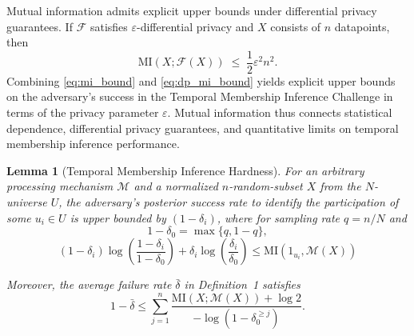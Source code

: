 \documentclass[letterpaper]{article} %
\newtheorem{lemma}[theorem]{Lemma}
\begin{document}
Mutual information admits explicit upper bounds under differential privacy guarantees. If $\mathcal{F}$ satisfies $\varepsilon$-differential privacy and $X$ consists of $n$ datapoints, then
\begin{equation}\label{eq:dp_mi_bound}
\mathrm{MI}\!\left(X;\mathcal{F}(X)\right)
\;\le\;
\frac{1}{2}\varepsilon^2 n^2.
\end{equation}
Combining \eqref{eq:mi_bound} and \eqref{eq:dp_mi_bound} yields explicit upper bounds on the adversary's success in the Temporal Membership Inference Challenge in terms of the privacy parameter $\varepsilon$. Mutual information thus connects statistical dependence, differential privacy guarantees, and quantitative limits on temporal membership inference performance.

\begin{lemma}[Temporal Membership Inference Hardness]\label{lem:membership-hardness}
For an arbitrary processing mechanism $\mathcal{M}$ and a normalized $n$-random-subset $X$ from the $N$-universe $U$, the adversary's posterior success rate to identify the participation of some $u_i \in U$ is upper bounded by $(1-\delta_i)$, where for sampling rate $q = n/N$ and
\[
1 - \delta_0 = \max\{q, 1-q\},
\]
\begin{equation}\label{eq:individual_mi_bound}
(1-\delta_i)\log\!\left(\frac{1-\delta_i}{1-\delta_0}\right)
+ \delta_i \log\!\left(\frac{\delta_i}{\delta_0}\right)
\le \mathrm{MI}(1_{u_i}, \mathcal{M}(X))
\end{equation}

Moreover, the average failure rate $\bar{\delta}$ in Definition~1 satisfies
\begin{equation}
1 - \bar{\delta}
\le
\sum_{j=1}^{n}
\frac{\mathrm{MI}(X;\mathcal{M}(X)) + \log 2}
{
-\log(1-\delta_0^{\ge j})
}.
\end{equation}
\end{lemma}
\end{document}
